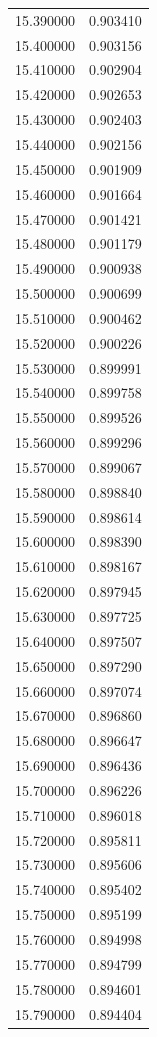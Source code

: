 \begin{tabular}{rr}
15.390000 & 0.903410 \\
15.400000 & 0.903156 \\
15.410000 & 0.902904 \\
15.420000 & 0.902653 \\
15.430000 & 0.902403 \\
15.440000 & 0.902156 \\
15.450000 & 0.901909 \\
15.460000 & 0.901664 \\
15.470000 & 0.901421 \\
15.480000 & 0.901179 \\
15.490000 & 0.900938 \\
15.500000 & 0.900699 \\
15.510000 & 0.900462 \\
15.520000 & 0.900226 \\
15.530000 & 0.899991 \\
15.540000 & 0.899758 \\
15.550000 & 0.899526 \\
15.560000 & 0.899296 \\
15.570000 & 0.899067 \\
15.580000 & 0.898840 \\
15.590000 & 0.898614 \\
15.600000 & 0.898390 \\
15.610000 & 0.898167 \\
15.620000 & 0.897945 \\
15.630000 & 0.897725 \\
15.640000 & 0.897507 \\
15.650000 & 0.897290 \\
15.660000 & 0.897074 \\
15.670000 & 0.896860 \\
15.680000 & 0.896647 \\
15.690000 & 0.896436 \\
15.700000 & 0.896226 \\
15.710000 & 0.896018 \\
15.720000 & 0.895811 \\
15.730000 & 0.895606 \\
15.740000 & 0.895402 \\
15.750000 & 0.895199 \\
15.760000 & 0.894998 \\
15.770000 & 0.894799 \\
15.780000 & 0.894601 \\
15.790000 & 0.894404 \\

\end{tabular}
